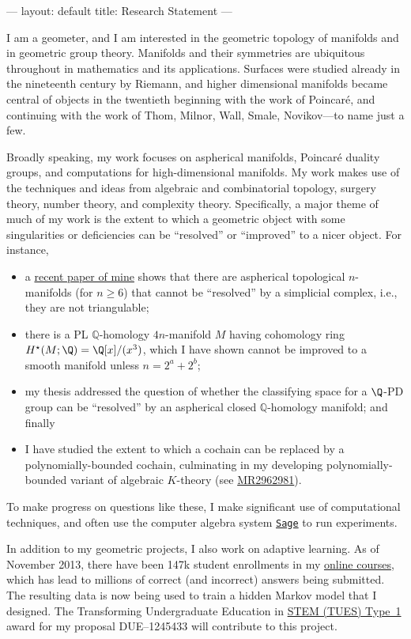 ---
layout: default
title: Research Statement
---

I am a geometer, and I am interested in the geometric topology of
manifolds and in geometric group theory.  Manifolds and their
symmetries are ubiquitous throughout in mathematics and its
applications.  Surfaces were studied already in the nineteenth century
by Riemann, and higher dimensional manifolds became central of objects
in the twentieth beginning with the work of Poincar\'e, and continuing
with the work of Thom, Milnor, Wall, Smale, Novikov---to name just a
few.

Broadly speaking, my work focuses on aspherical manifolds, Poincar\'e
duality groups, and computations for high-dimensional manifolds.  My
work makes use of the techniques and ideas from algebraic and
combinatorial topology, surgery theory, number theory, and complexity
theory.  Specifically, a major theme of much of my work is the extent
to which a geometric object with some singularities or deficiencies
can be ``resolved'' or ``improved'' to a nicer object.  For instance,

\begin{itemize}
\item a \href{http://arxiv.org/abs/1304.3730}{recent paper of mine}
  shows that there are aspherical topological $n$-manifolds (for $n
  \geq 6$) that cannot be ``resolved'' by a simplicial complex, i.e.,
  they are not triangulable;
\item there is a PL $\mathbb{Q}$-homology $4n$-manifold $M$ having
  cohomology ring $H^\star(M;\Q) = \Q[x]/(x^3)$, which I have shown
  cannot be improved to a smooth manifold unless $n = 2^a + 2^b$;
\item my thesis addressed the question of whether the classifying
  space for a $\Q$-PD group can be ``resolved'' by an aspherical
  closed $\mathbb{Q}$-homology manifold; and finally
\item I have studied the extent to which a cochain can be replaced by
  a polynomially-bounded cochain, culminating in my developing
  polynomially-bounded variant of algebraic $K$-theory (see
  \href{http://www.ams.org/mathscinet-getitem?mr=2962981}{MR2962981}).
\end{itemize}

To make progress on questions like these, I make significant use of
computational techniques, and often use the computer algebra system
\href{http://sagemath.org/}{\texttt{Sage}} to run experiments.  

In addition to my geometric projects, I also work on adaptive
learning.  As of November 2013, there have been 147k student
enrollments in my \href{http://kisonecat.com/teaching/2014/calculus-two/}{online courses}, which has lead to millions of correct (and incorrect)
answers being submitted.  The resulting data is now being used to
train a hidden Markov model that I designed.  The Transforming
Undergraduate Education in \href{http://www.nsf.gov/funding/pgm_summ.jsp?pims_id=5741}{STEM (TUES) Type~1} award for my proposal
DUE--1245433 will contribute to this project.
